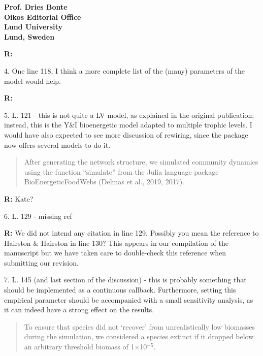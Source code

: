 \documentclass[12pt]{letter}
\begin{document}
\begin{letter}{\bf Prof. Dries Bonte\\
Oikos Editorial Office \\
Lund University \\
Lund, Sweden}
    \smallskip

    \textbf{R:} %

    \smallskip

    4. One line 118, I think a more complete list of the (many) parameters of the model would help.


    \smallskip

    \textbf{R:}

    \smallskip

    5. L. 121 - this is not quite a LV model, as explained in the original publication; instead, this is the Y\&I bioenergetic model adapted to multiple trophic levels. I would have also expected to see more discussion of rewiring, since the package now offers several models to do it.

    \begin{quotation}
    After generating the network structure, we simulated community dynamics using the function “simulate” from the Julia language package BioEnergeticFoodWebs (Delmas et al., 2019, 2017).
    \end{quotation}

    \smallskip

    \textbf{R:} Kate?

    \smallskip

    6. L. 129 - missing ref

    \smallskip

    \textbf{R:} We did not intend any citation in line 129. Possibly you mean the reference to Hairston \& Hairston in line 130? This appears in our compilation of the manuscript but we have taken care to double-check this reference when submitting our revision.%

    \smallskip

    7. L. 145 (and last section of the discussion) - this is probably something that should be implemented as a continuous callback. Furthermore, setting this empirical parameter should be accompanied with a small sensitivity analysis, as it can indeed have a strong effect on the results.

    \smallskip

    \begin{quotation}
    To ensure that species did not ‘recover’ from unrealistically low biomasses during the simulation, we considered a species extinct if it dropped below an arbitrary threshold biomass of 1×10$^{−5}$.


\end{quotation}
\end{letter}
\end{document}
